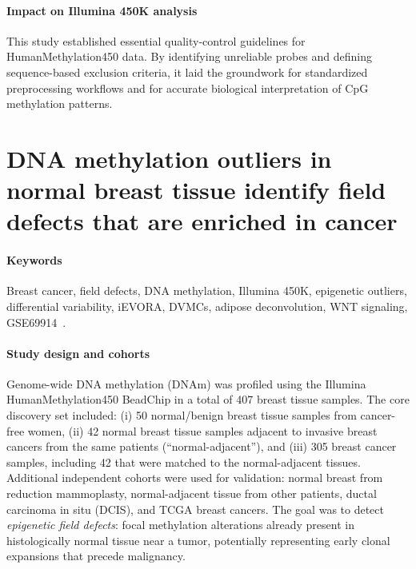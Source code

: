 \documentclass[10pt]{extarticle}
\begin{document}
\paragraph{Impact on Illumina 450K analysis}
This study established essential quality-control guidelines for HumanMethylation450 data. By identifying unreliable probes and defining sequence-based exclusion criteria, it laid the groundwork for standardized preprocessing workflows and for accurate biological interpretation of CpG methylation patterns.


\section{DNA methylation outliers in normal breast tissue identify field defects that are enriched in cancer}


\paragraph{Keywords}
Breast cancer, field defects, DNA methylation, Illumina 450K, epigenetic outliers, differential variability, iEVORA, DVMCs, adipose deconvolution, WNT signaling, GSE69914~\cite{teschendorff2016fielddefects}.

\paragraph{Study design and cohorts}
Genome-wide DNA methylation (DNAm) was profiled using the Illumina HumanMethylation450 BeadChip in a total of 407 breast tissue samples. The core discovery set included: (i) 50 normal/benign breast tissue samples from cancer-free women, (ii) 42 normal breast tissue samples adjacent to invasive breast cancers from the same patients (``normal-adjacent''), and (iii) 305 breast cancer samples, including 42 that were matched to the normal-adjacent tissues. Additional independent cohorts were used for validation: normal breast from reduction mammoplasty, normal-adjacent tissue from other patients, ductal carcinoma in situ (DCIS), and TCGA breast cancers. The goal was to detect \textit{epigenetic field defects}: focal methylation alterations already present in histologically normal tissue near a tumor, potentially representing early clonal expansions that precede malignancy.
\end{document}
